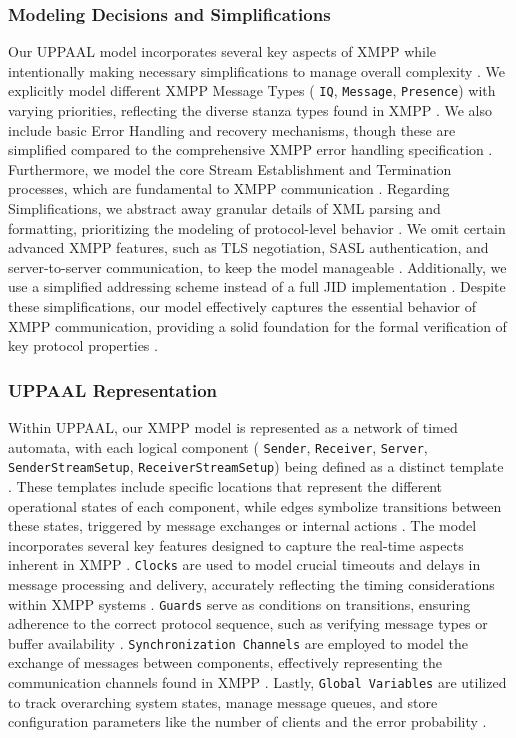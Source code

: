\subsubsection{Modeling Decisions and Simplifications}
Our UPPAAL model incorporates several key aspects of XMPP while intentionally making necessary simplifications to manage overall complexity \cite{larsen1997uppaal,clarke1997model}. We explicitly model different XMPP Message Types ( \texttt{IQ}, \texttt{Message}, \texttt{Presence}) with varying priorities, reflecting the diverse stanza types found in XMPP \cite{smith2009xmpp}. We also include basic Error Handling and recovery mechanisms, though these are simplified compared to the comprehensive XMPP error handling specification \cite{rfc6120}. Furthermore, we model the core Stream Establishment and Termination processes, which are fundamental to XMPP communication \cite{meijer2005jabber}. Regarding Simplifications, we abstract away granular details of XML parsing and formatting, prioritizing the modeling of protocol-level behavior \cite{clarke1997model}. We omit certain advanced XMPP features, such as TLS negotiation, SASL authentication, and server-to-server communication, to keep the model manageable \cite{baier2008principles}. Additionally, we use a simplified addressing scheme instead of a full JID implementation \cite{adams2002xep}. Despite these simplifications, our model effectively captures the essential behavior of XMPP communication, providing a solid foundation for the formal verification of key protocol properties \cite{clarke1997model,larsen1997uppaal}.

\subsubsection{UPPAAL Representation}
Within UPPAAL, our XMPP model is represented as a network of timed automata, with each logical component ( \texttt{Sender}, \texttt{Receiver}, \texttt{Server}, \texttt{SenderStreamSetup}, \texttt{ReceiverStreamSetup}) being defined as a distinct template \cite{larsen1997uppaal}. These templates include specific locations that represent the different operational states of each component, while edges symbolize transitions between these states, triggered by message exchanges or internal actions \cite{bengtsson2003timed}. The model incorporates several key features designed to capture the real-time aspects inherent in XMPP \cite{alur1994theory,larsen1997uppaal}. \texttt{Clocks} are used to model crucial timeouts and delays in message processing and delivery, accurately reflecting the timing considerations within XMPP systems \cite{waher2015learning}. \texttt{Guards} serve as conditions on transitions, ensuring adherence to the correct protocol sequence, such as verifying message types or buffer availability \cite{bengtsson2003timed}. \texttt{Synchronization Channels} are employed to model the exchange of messages between components, effectively representing the communication channels found in XMPP \cite{larsen1997uppaal}. Lastly, \texttt{Global Variables} are utilized to track overarching system states, manage message queues, and store configuration parameters like the number of clients and the error probability \cite{behrmann2004tutorial}.

